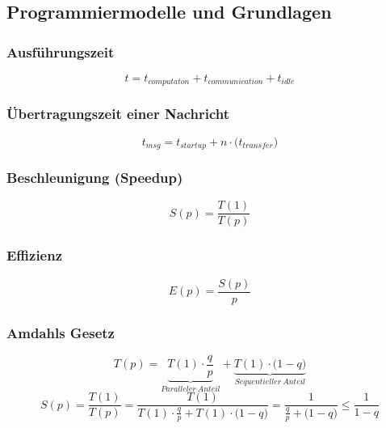 \subsection{Programmiermodelle und Grundlagen}

\subsubsection{Ausführungszeit}
\begin{equation}
	t = t_{computaton} + t_{communication} + t_{idle}
\end{equation}

\subsubsection{Übertragungszeit einer Nachricht}
\begin{equation}
	t_{msg} = t_{startup} + n \cdot \big( t_{transfer} \big)
\end{equation}

\subsubsection{Beschleunigung (Speedup)}
\begin{equation}
	S(p) = \frac{T(1)}{T(p)}
\end{equation}

\subsubsection{Effizienz}
\begin{equation}
	E(p) = \frac{S(p)}{p}
\end{equation}

\subsubsection{Amdahls Gesetz}
\begin{equation}
	T(p) = \underbrace{T(1) \cdot \frac{q}{p}}_{Paralleler~Anteil} + \underbrace{T(1) \cdot \big(1-q\big)}_{Sequentieller~Anteil}
\end{equation}
\begin{equation}
	S(p) = \frac{T(1)}{T(p)} = \frac{T(1)}{T(1) \cdot \frac{q}{p} + T(1) \cdot \big(1-q\big)} = \frac{1}{\frac{q}{p} + \big( 1 - q \big)} \le \frac{1}{1-q}
\end{equation}